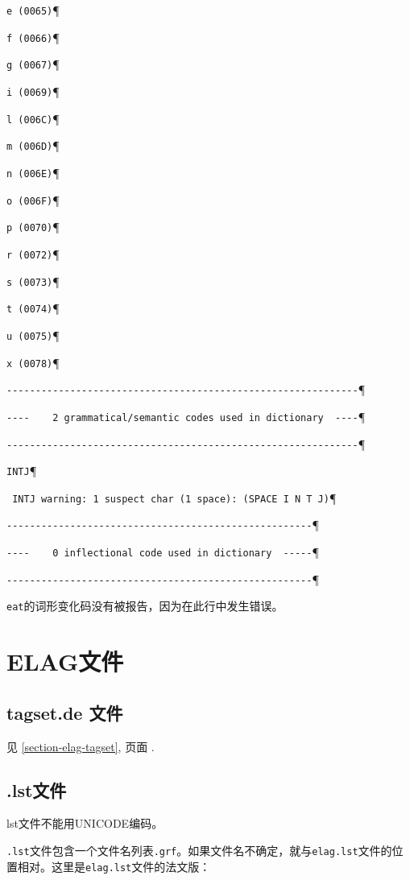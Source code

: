 \verb$e (0065)$\P

\verb$f (0066)$\P

\verb$g (0067)$\P

\verb$i (0069)$\P

\verb$l (006C)$\P

\verb$m (006D)$\P

\verb$n (006E)$\P

\verb$o (006F)$\P

\verb$p (0070)$\P

\verb$r (0072)$\P

\verb$s (0073)$\P

\verb$t (0074)$\P

\verb$u (0075)$\P

\verb$x (0078)$\P

\verb$-------------------------------------------------------------$\P

\verb$----    2 grammatical/semantic codes used in dictionary  ----$\P

\verb$-------------------------------------------------------------$\P

\verb$INTJ$\P

\verb$ INTJ warning: 1 suspect char (1 space): (SPACE I N T J)$\P

\verb$-----------------------------------------------------$\P

\verb$----    0 inflectional code used in dictionary  -----$\P

\verb$-----------------------------------------------------$\P

\bigskip
\noindent 
\verb+eat+的词形变化码没有被报告，因为在此行中发生错误。


\section{ ELAG文件}
\subsection{ tagset.de 文件}
见 \ref{section-elag-tagset}, 页面 \pageref{section-elag-tagset}.

\subsection{ .lst文件}
lst文件不能用UNICODE编码。


\bigskip
\noindent
\verb$.lst$文件包含一个文件名列表\verb$.grf$。如果文件名不确定，就与\verb$elag.lst$文件的位置相对。这里是\verb$elag.lst$文件的法文版：


